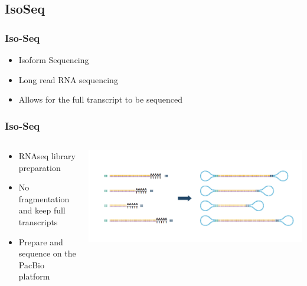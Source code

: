 \documentclass[14pt]{beamer}
\begin{document}
\subsection{IsoSeq}

\begin{frame}
\frametitle{Iso-Seq}
\begin{itemize}
	\item<+-> Isoform Sequencing
	\item<+-> Long read RNA sequencing
	\item<+-> Allows for the full transcript to be sequenced
\end{itemize}
\end{frame}

\begin{frame}
\frametitle{Iso-Seq}
\begin{columns}
	\begin{column}{0.5\textwidth}
		\begin{itemize}
			\item<+-> RNAseq library preparation
			\item<+-> No fragmentation and keep full transcripts
			\item<+-> Prepare and sequence on the PacBio platform
		\end{itemize}
		\end{column}
	\begin{column}{0.5\textwidth}
		\begin{center}
     		\includegraphics[width=1\textwidth]{images_20170926_isoseqprep.png}
     	\end{center}
	\end{column}
\end{columns}
\end{frame}
\end{document}

